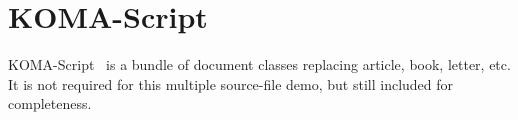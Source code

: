 \documentclass[master.tex]{subfiles}
\begin{document}
\chapter{KOMA-Script}

KOMA-Script~\cite{komascript} is a bundle of document classes
replacing article, book, letter, etc.
It is not required for this multiple source-file demo,
but still included for completeness.
\end{document}
